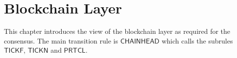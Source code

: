 \section{Blockchain Layer}
\label{sec:blockchain}

This chapter introduces the view of the blockchain layer as required for the
consensus. The main transition rule is $\mathsf{CHAINHEAD}$ which calls the subrules
$\mathsf{TICKF}$, $\mathsf{TICKN}$ and $\mathsf{PRTCL}$.



\clearpage



\clearpage



\clearpage



\clearpage



\clearpage



\clearpage


